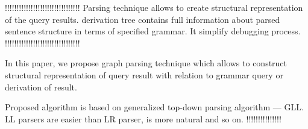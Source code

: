 \documentclass{sig-alternate} %
\begin{document}
!!!!!!!!!!!!!!!!!!!!!!!!!!!!!!!!
Parsing technique allows to create structural representation of the query results. derivation tree contains full information about parsed sentence structure in terms of specified grammar. It simplify debugging process. 
!!!!!!!!!!!!!!!!!!!!!!!!!!!!!!!!

In this paper, we propose graph parsing technique which allows to construct structural representation of query result with relation to grammar query or derivation of result.

Proposed algorithm is based on generalized top-down parsing algorithm --- GLL. LL parsers are easier than LR parser, is more natural and so on. !!!!!!!!!!!!!!!













\end{document}
